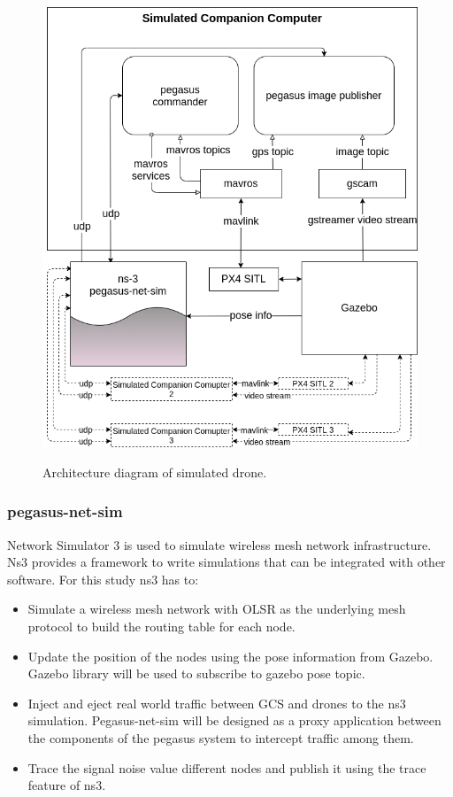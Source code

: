 \begin{figure}
	\centering
	\caption[Pegasus GCS system simulation overview]{\small Architecture diagram of simulated drone.}
	\includegraphics[width=5in]{figures/methodology/methodology-drone-components-simulated}
	\label{fig:drone-components-simulated}
\end{figure}


\subsubsection{pegasus-net-sim}

Network Simulator 3 is used to simulate wireless mesh network infrastructure. Ns3 provides a framework to write simulations that can be integrated with other software. For this study ns3 has to:
\begin{itemize}
	\item Simulate a wireless mesh network with OLSR as the underlying mesh protocol to build the routing table for each node.
	\item Update the position of the nodes using the pose information from Gazebo. Gazebo library will be used to subscribe to gazebo pose topic.
	\item Inject and eject real world traffic between GCS and drones to the ns3 simulation. Pegasus-net-sim will be designed as a proxy application between the components of the pegasus system to intercept traffic among them.
	\item Trace the signal noise value different nodes and publish it using the trace feature of ns3.
\end{itemize}

